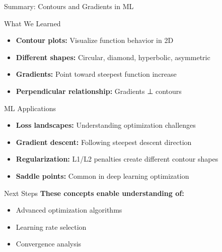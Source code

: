 \documentclass[10pt]{beamer}
\begin{document}
\begin{frame}{Summary: Contours and Gradients in ML}
\begin{keypointsbox}{What We Learned}
\begin{itemize}
\item \textbf{Contour plots:} Visualize function behavior in 2D
\item \textbf{Different shapes:} Circular, diamond, hyperbolic, asymmetric
\item \textbf{Gradients:} Point toward steepest function increase
\item \textbf{Perpendicular relationship:} Gradients ⊥ contours
\end{itemize}
\end{keypointsbox}

\begin{alertbox}{ML Applications}
\begin{itemize}
\item \textbf{Loss landscapes:} Understanding optimization challenges
\item \textbf{Gradient descent:} Following steepest descent direction
\item \textbf{Regularization:} L1/L2 penalties create different contour shapes
\item \textbf{Saddle points:} Common in deep learning optimization
\end{itemize}
\end{alertbox}

\begin{definitionbox}{Next Steps}
\textbf{These concepts enable understanding of:}
\begin{itemize}
\item Advanced optimization algorithms
\item Learning rate selection
\item Convergence analysis
\end{itemize}
\end{definitionbox}
\end{frame}
\end{document}
